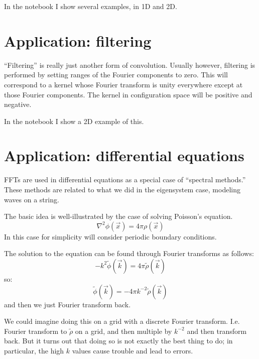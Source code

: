 In the notebook I show several examples, in 1D and 2D. 

\section{Application: filtering}

``Filtering'' is really just another form of convolution. Usually
however, filtering is performed by setting ranges of the Fourier
components to zero. This will correspond to a kernel whose Fourier
transform is unity everywhere except at those Fourier components.  The
kernel in configuration space will be positive and negative.

In the notebook I show a 2D example of this. 

\section{Application: differential equations}

FFTs are used in differential equations as a special case of
``spectral methods.'' These methods are related to what we did in the
eigensystem case, modeling waves on a string.

The basic idea is well-illustrated by the case of solving Poisson's
equation.
\begin{equation}
\nabla^2 \phi(\vec{x}) = 4\pi \rho(\vec{x})
\end{equation}
In this case for simplicity will consider periodic boundary
conditions. 

The solution to the equation can be found through Fourier transforms
as follows:
\begin{equation}
- k^2 \tilde\phi(\vec{k}) = 4\pi \tilde\rho(\vec{k})
\end{equation}
so:
\begin{equation}
\tilde\phi(\vec{k}) = - 4\pi k^{-2} \tilde\rho(\vec{k})
\end{equation}
and then we just Fourier transform back. 

We could imagine doing this on a grid with a discrete Fourier
transform. I.e. Fourier transform to $\tilde\rho$ on a grid, and then
multiple by $k^{-2}$ and then transform back. But it turns out that
doing so is not exactly the best thing to do; in particular, the high
$k$ values cause trouble and lead to errors.  

